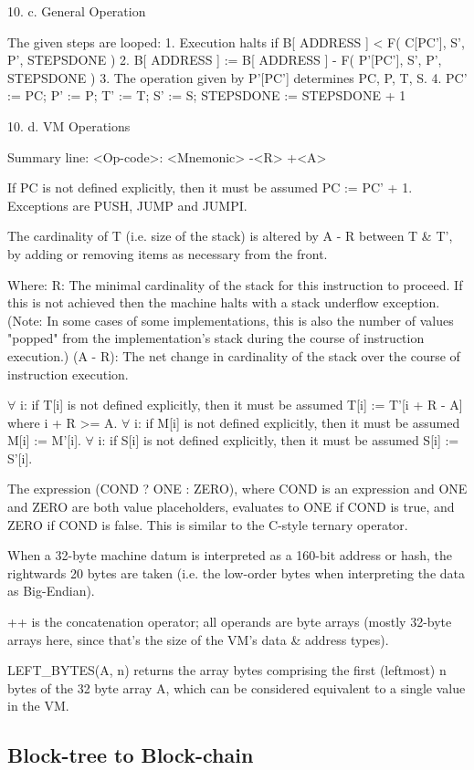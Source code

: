 \documentclass[9pt,oneside]{amsart}
\begin{document}
\begin{multicols}{2}
10. c. General Operation

The given steps are looped:
1. Execution halts if B[ ADDRESS ] < F( C[PC'], S', P', STEPSDONE )
2. B[ ADDRESS ] := B[ ADDRESS ] - F( P'[PC'], S', P', STEPSDONE )
3. The operation given by P'[PC'] determines PC, P, T, S.
4. PC' := PC; P' := P; T' := T; S' := S; STEPSDONE := STEPSDONE + 1


10. d. VM Operations

Summary line:
<Op-code>: <Mnemonic> -<R> +<A>

If PC is not defined explicitly, then it must be assumed PC := PC' + 1. Exceptions are PUSH, JUMP and JUMPI.

The cardinality of T (i.e. size of the stack) is altered by A - R between T \& T', by adding or removing items as necessary from the front.

Where:
R: The minimal cardinality of the stack for this instruction to proceed. If this is not achieved then the machine halts with a stack underflow exception. (Note: In some cases of some implementations, this is also the number of values "popped" from the implementation's stack during the course of instruction execution.)
(A - R): The net change in cardinality of the stack over the course of instruction execution.

$\forall$ i: if T[i] is not defined explicitly, then it must be assumed T[i] := T'[i + R - A] where i + R >= A.
$\forall$ i: if M[i] is not defined explicitly, then it must be assumed M[i] := M'[i].
$\forall$ i: if S[i] is not defined explicitly, then it must be assumed S[i] := S'[i].

The expression (COND ? ONE : ZERO), where COND is an expression and ONE and ZERO are both value placeholders, evaluates to ONE if COND is true, and ZERO if COND is false. This is similar to the C-style ternary operator.

When a 32-byte machine datum is interpreted as a 160-bit address or hash, the rightwards 20 bytes are taken (i.e. the low-order bytes when interpreting the data as Big-Endian).

++ is the concatenation operator; all operands are byte arrays (mostly 32-byte arrays here, since that's the size of the VM's data \& address types).

LEFT\_BYTES(A, n) returns the array bytes comprising the first (leftmost) n bytes of the 32 byte array A, which can be considered equivalent to a single value in the VM.



\subsection{Block-tree to Block-chain} \label{ch:ghost}


\end{multicols}
\end{document}
